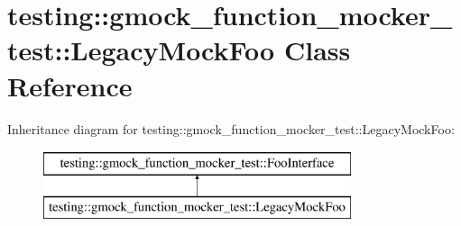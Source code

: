 \hypertarget{classtesting_1_1gmock__function__mocker__test_1_1LegacyMockFoo}{}\section{testing\+:\+:gmock\+\_\+function\+\_\+mocker\+\_\+test\+:\+:Legacy\+Mock\+Foo Class Reference}
\label{classtesting_1_1gmock__function__mocker__test_1_1LegacyMockFoo}
Inheritance diagram for testing\+:\+:gmock\+\_\+function\+\_\+mocker\+\_\+test\+:\+:Legacy\+Mock\+Foo\+:\begin{figure}[H]
\begin{center}
\leavevmode
\includegraphics[height=2.000000cm]{classtesting_1_1gmock__function__mocker__test_1_1LegacyMockFoo}
\end{center}
\end{figure}
